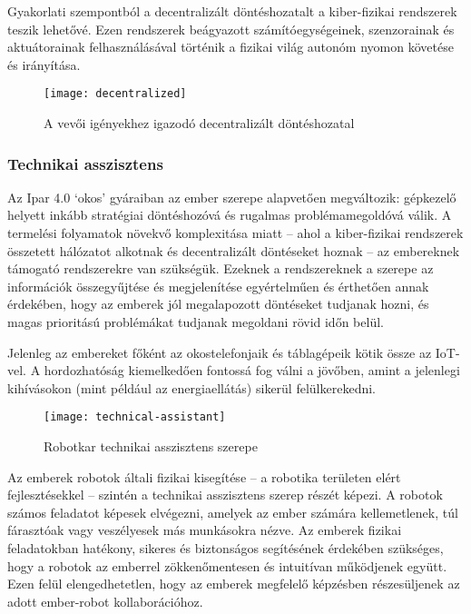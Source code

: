 \documentclass[../documentation.tex]{subfiles}
\begin{document}
Gyakorlati szempontból a decentralizált döntéshozatalt a kiber-fizikai rendszerek teszik lehetővé. Ezen rendszerek beágyazott számítóegységeinek, szenzorainak és aktuátorainak felhasználásával történik a fizikai világ autonóm nyomon követése és irányítása. 

\begin{figure}[h]
\centering
\texttt{[image: decentralized]}
\caption{A vevői igényekhez igazodó decentralizált döntéshozatal\protect\footnotemark}
\label{fig:decentralized}
\end{figure}

\subsubsection{Technikai asszisztens}
Az Ipar 4.0 `okos' gyáraiban az ember szerepe alapvetően megváltozik: gépkezelő helyett inkább stratégiai döntéshozóvá és rugalmas problémamegoldóvá válik. A termelési folyamatok növekvő komplexitása miatt -- ahol a kiber-fizikai rendszerek összetett hálózatot alkotnak és decentralizált döntéseket hoznak -- az embereknek támogató rendszerekre van szükségük. Ezeknek a rendszereknek a szerepe az információk összegyűjtése és megjelenítése egyértelműen és érthetően annak érdekében, hogy az emberek jól megalapozott döntéseket tudjanak hozni, és magas prioritású problémákat tudjanak megoldani rövid időn belül.

Jelenleg az embereket főként az okostelefonjaik és táblagépeik kötik össze az IoT-vel\cite{fromiot2ioe}. A hordozhatóság kiemelkedően fontossá fog válni a jövőben, amint a jelenlegi kihívásokon (mint például az energiaellátás) sikerül felülkerekedni.

\begin{figure}[h]
\centering
\texttt{[image: technical-assistant]}
\caption{Robotkar technikai asszisztens szerepe\protect\footnotemark}
\label{fig:technical-assistant}
\end{figure}

Az emberek robotok általi fizikai kisegítése -- a robotika területen elért fejlesztésekkel -- szintén a technikai asszisztens szerep részét képezi. A robotok számos feladatot képesek elvégezni, amelyek az ember számára kellemetlenek, túl fárasztóak vagy veszélyesek más munkásokra nézve\cite{hri}. Az emberek fizikai feladatokban hatékony, sikeres és biztonságos segítésének érdekében szükséges, hogy a robotok az emberrel zökkenőmentesen és intuitívan működjenek együtt\cite{hri}. Ezen felül elengedhetetlen, hogy az emberek megfelelő képzésben részesüljenek az adott ember-robot kollaborációhoz\cite{m-learning}.
\end{document}
